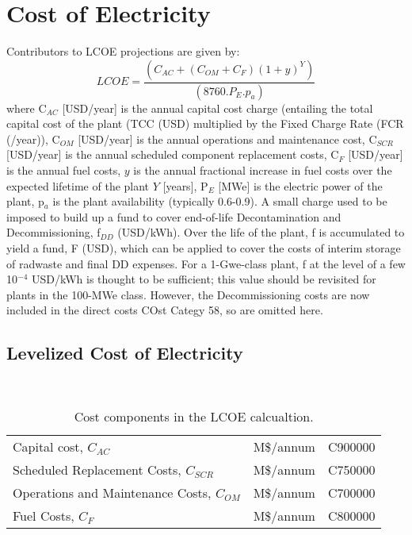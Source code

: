 \newpage 

\section{Cost of Electricity} 

 Contributors to LCOE projections are given by: 
 \begin{equation} 
 LCOE = \frac{(C_{AC} + (C_{OM} + C_{F})(1+y)^Y)}{(8760.P_E.p_a)} 
 \label{eq:coe}
\end{equation} 
where C$_{AC}$ [USD/year] is the annual capital cost charge (entailing the total capital cost of the plant (TCC (USD) multiplied by the Fixed Charge Rate (FCR (/year)), C$_{OM}$ [USD/year] is the annual operations and maintenance cost, C$_{SCR}$ [USD/year] is the annual scheduled component replacement costs, C$_{F}$ [USD/year] is the annual fuel costs, $y$ is the annual fractional increase in fuel costs over the expected lifetime of the plant $Y$ [years], P$_{E}$ [MWe] is the electric power of the plant, p$_{a}$ is the plant availability (typically 0.6-0.9).  A small charge used to be imposed to build up a fund to cover end-of-life Decontamination and Decommissioning, f$_{DD}$ (USD/kWh).  Over the life of the plant, {f} is accumulated to yield a fund, {F} (USD), which can be applied to cover the costs of interim storage of radwaste and final DD expenses.  For a 1-Gwe-class plant, {f} at the level of a few 10$^{-4}$ USD/kWh is thought to be sufficient; this value should be revisited for plants in the 100-MWe class. However, the Decommissioning costs are now included in the direct costs COst Categy 58, so are omitted here.\\





\subsection{Levelized Cost of Electricity} \\ 

\begin{table}[h!] 
\begin{tabular}{l c c } 
Capital cost, $C_{AC}$ &     M\$/annum    &    C900000      \\ 
Scheduled Replacement Costs, $C_{SCR}$  &     M\$/annum    &  C750000   \\ 
Operations and Maintenance Costs, $C_{OM}$ & M\$/annum  &      C700000 \\ 
Fuel Costs, $C_{F}$ & M\$/annum  &       C800000 \\ 
    \end{tabular} 
    \caption{Cost components in the LCOE calcualtion.}
    \label{tab:lcoe} 
\end{table} 

